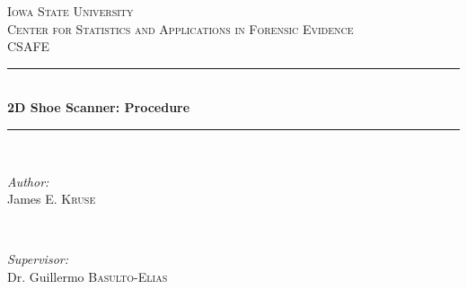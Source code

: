 \begin{titlepage}

\newcommand{\HRule}{\rule{\linewidth}{0.5mm}} %

\center %
 

\textsc{\LARGE Iowa State University}\\[1.5cm] %
\textsc{\Large Center for Statistics and Applications in Forensic Evidence}\\[0.5cm] %
\textsc{\large CSAFE }\\[0.5cm] %


\HRule \\[0.4cm]
{ \huge \bfseries 2D Shoe Scanner: Procedure }\\[0.4cm] %
\HRule \\[1.5cm]
 

\begin{minipage}{0.4\textwidth}
\begin{flushleft} \large
\emph{Author:}\\
James \textsc{E. Kruse} %
\end{flushleft}
\end{minipage}
~
\begin{minipage}{0.4\textwidth}
\begin{flushright} \large
\emph{Supervisor:} \\
Dr. Guillermo \textsc{Basulto-Elias} %
\end{flushright}
\end{minipage}\\[2cm]


\end{titlepage}
